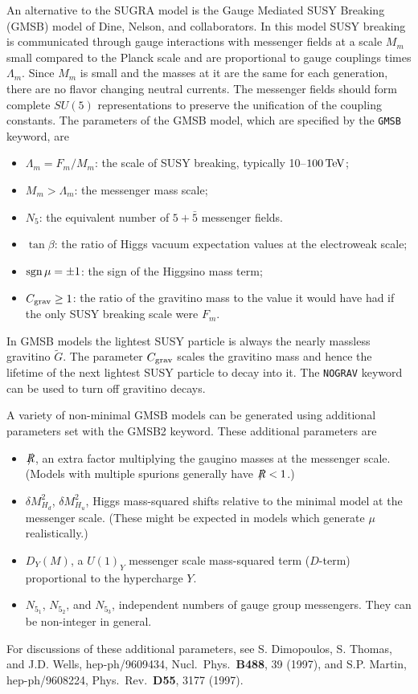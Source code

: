       An alternative to the SUGRA model is the Gauge Mediated SUSY
Breaking (GMSB) model of Dine, Nelson, and collaborators. In this model
SUSY breaking is communicated through gauge interactions with messenger
fields at a scale $M_m$ small compared to the Planck scale and are
proportional to gauge couplings times $\Lambda_m$. Since $M_m$ is small
and the masses at it are the same for each generation, there are no
flavor changing neutral currents. The messenger fields should form
complete $SU(5)$ representations to preserve the unification of the
coupling constants. The parameters of the GMSB model, which are
specified by the \verb|GMSB| keyword, are
\begin{itemize}
\item $\Lambda_m = F_m/M_m$: the scale of SUSY breaking, typically
10--$100\,{\rm TeV}$;
\item $M_m > \Lambda_m$: the messenger mass scale; 
\item $N_5$: the equivalent number of $5+\bar5$ messenger fields.
\item $\tan\beta$: the ratio of Higgs vacuum expectation values at the
electroweak scale;
\item $\mathop{\rm sgn}\mu=\pm1$: the sign of the Higgsino mass term;
\item $C_{\rm grav}\ge1$: the ratio of the gravitino mass to the value it
would have had if the only SUSY breaking scale were $F_m$.
\end{itemize}
In GMSB models the lightest SUSY particle is always the nearly massless
gravitino $\tilde G$. The parameter $C_{\rm grav}$ scales the gravitino
mass and hence the lifetime of the next lightest SUSY particle to decay
into it. The \verb|NOGRAV| keyword can be used to turn off gravitino
decays. 

      A variety of non-minimal GMSB models can be generated using
additional parameters set with the GMSB2 keyword. These additional
parameters are
\begin{itemize}
\item $\slashchar{R}$, an extra factor multiplying the gaugino masses
at the messenger scale. (Models with multiple spurions generally have
$\slashchar{R}<1$.)
\item $\delta M_{H_d}^2$, $\delta M_{H_u}^2$, Higgs mass-squared
shifts relative to the minimal model at the messenger scale. (These
might be expected in models which generate $\mu$ realistically.)
\item $D_Y(M)$, a $U(1)_Y$ messenger scale mass-squared term
($D$-term) proportional to the hypercharge $Y$.
\item $N_{5_1}$, $N_{5_2}$, and $N_{5_3}$, independent numbers of
gauge group messengers. They can be non-integer in general.
\end{itemize}
For discussions of these additional parameters, see S. Dimopoulos, S.
Thomas, and J.D. Wells, hep-ph/9609434, Nucl.\ Phys.\ {\bf B488}, 39
(1997), and S.P. Martin, hep-ph/9608224, Phys.\ Rev.\ {\bf D55}, 3177
(1997).

